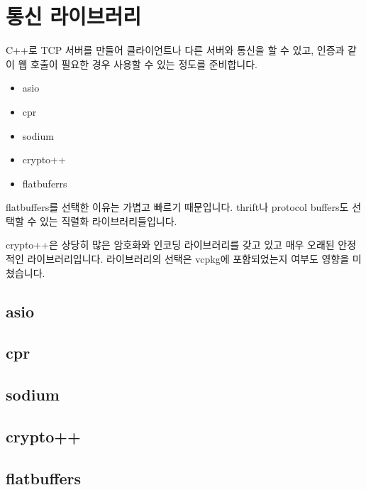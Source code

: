 \chapter{통신 라이브러리}

C++로 TCP 서버를 만들어 클라이언트나 다른 서버와 통신을 할 수 있고, 인증과 같이 
웹 호출이 필요한 경우 사용할 수 있는 정도를 준비합니다. 

\begin{itemize}
    \item asio 
    \item cpr 
    \item sodium 
    \item crypto++
    \item flatbuferrs
\end{itemize}

flatbuffers를 선택한 이유는 가볍고 빠르기 때문입니다. thrift나 protocol buffers도 
선택할 수 있는 직렬화 라이브러리들입니다. 

crypto++은 상당히 많은 암호화와 인코딩 라이브러리를 갖고 있고 매우 오래된 안정적인 
라이브러리입니다. 라이브러리의 선택은 vcpkg에 포함되었는지 여부도 영향을 미쳤습니다. 

\section{asio}


\section{cpr}


\section{sodium}


\section{crypto++}


\section{flatbuffers}

